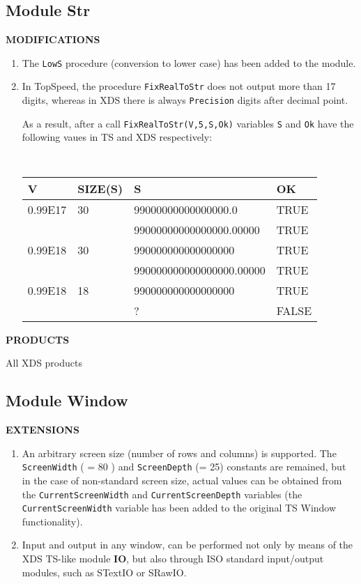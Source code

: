 \subsection{Module Str}

{\bf MODIFICATIONS}

\begin{enumerate}
\item The \verb'LowS' procedure (conversion to lower case) has been added to
      the module.
\item In TopSpeed, the procedure \verb'FixRealToStr' does not output more than 
      17 digits, whereas in XDS there is always \verb'Precision' digits after 
      decimal point.

      As a result, after a call \verb'FixRealToStr(V,5,S,Ok)' variables
      \verb'S' and \verb'Ok' have the following vaues in TS and XDS 
      respectively:

      {\tt
      \begin{tabular}{ll|ll}
      V       & SIZE(S) & S                       & OK \\
      \hline
      0.99E17 & 30      & 99000000000000000.0      & TRUE \\
              &         & 99000000000000000.00000  & TRUE \\
      0.99E18 & 30      & 990000000000000000       & TRUE \\
              &         & 990000000000000000.00000 & TRUE \\
      0.99E18 & 18      & 990000000000000000       & TRUE \\
              &         & ?                        & FALSE \\
      \end{tabular}
      }
   

\end{enumerate}

{\bf PRODUCTS}

All XDS products


\subsection{Module Window}

{\bf EXTENSIONS}

\begin{enumerate}
\item An arbitrary screen size (number of rows and columns) is supported.
      The \verb'ScreenWidth' ( = 80 ) and \verb'ScreenDepth' (= 25) constants are
      remained, but in the case of non-standard screen size,
      actual values can be obtained from the \verb'CurrentScreenWidth' and
      \verb'CurrentScreenDepth' variables (the \verb'CurrentScreenWidth' variable has
      been added to the original TS Window functionality).

\item Input and output in any window, can be performed not only by means
      of the XDS TS-like module {\bf IO}, but also through ISO standard
      input/output modules, such as STextIO or SRawIO.
\end{enumerate}

